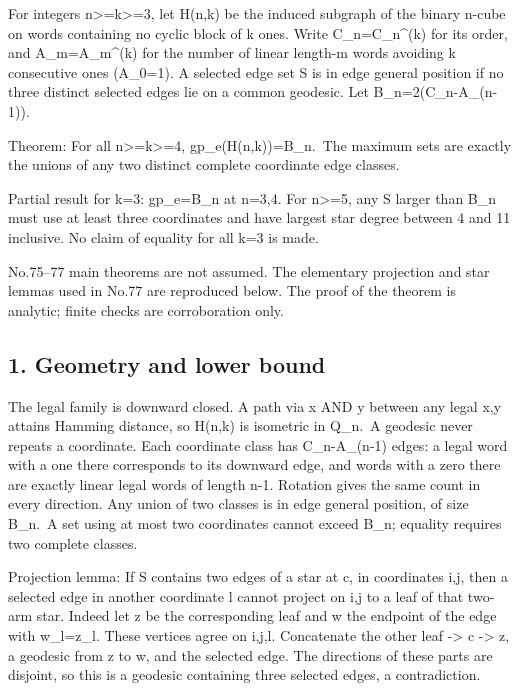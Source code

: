 \documentclass[
  10pt,
]{article}
\begin{document}
For integers n\textgreater=k\textgreater=3, let H(n,k) be the induced
subgraph of the binary n-cube on words containing no cyclic block of k
ones. Write C\_n=C\_n\^{}(k) for its order, and A\_m=A\_m\^{}(k) for the
number of linear length-m words avoiding k consecutive ones (A\_0=1). A
selected edge set S is in edge general position if no three distinct
selected edges lie on a common geodesic. Let B\_n=2(C\_n-A\_(n-1)).

Theorem: For all n\textgreater=k\textgreater=4, gp\_e(H(n,k))=B\_n.~The
maximum sets are exactly the unions of any two distinct complete
coordinate edge classes.

Partial result for k=3: gp\_e=B\_n at n=3,4. For n\textgreater=5, any S
larger than B\_n must use at least three coordinates and have largest
star degree between 4 and 11 inclusive. No claim of equality for all k=3
is made.

No.75--77 main theorems are not assumed. The elementary projection and
star lemmas used in No.77 are reproduced below. The proof of the theorem
is analytic; finite checks are corroboration only.

\subsection{1. Geometry and lower bound}\label{geometry-and-lower-bound}

The legal family is downward closed. A path via x AND y between any
legal x,y attains Hamming distance, so H(n,k) is isometric in Q\_n.~A
geodesic never repeats a coordinate. Each coordinate class has
C\_n-A\_(n-1) edges: a legal word with a one there corresponds to its
downward edge, and words with a zero there are exactly linear legal
words of length n-1. Rotation gives the same count in every direction.
Any union of two classes is in edge general position, of size B\_n.~A
set using at most two coordinates cannot exceed B\_n; equality requires
two complete classes.

Projection lemma: If S contains two edges of a star at c, in coordinates
i,j, then a selected edge in another coordinate l cannot project on i,j
to a leaf of that two-arm star. Indeed let z be the corresponding leaf
and w the endpoint of the edge with w\_l=z\_l. These vertices agree on
i,j,l. Concatenate the other leaf -\textgreater{} c -\textgreater{} z, a
geodesic from z to w, and the selected edge. The directions of these
parts are disjoint, so this is a geodesic containing three selected
edges, a contradiction.
\end{document}
